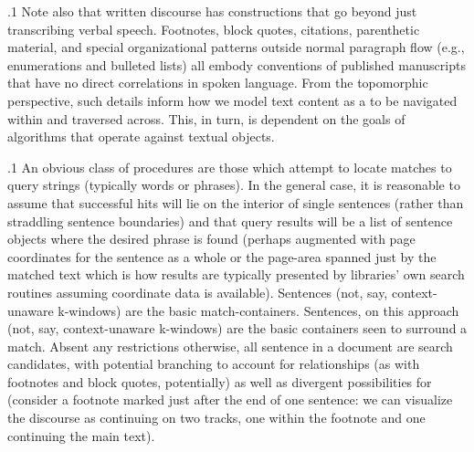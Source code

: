 \documentclass[11pt, twocolumn]{article}
\begin{document}
\p.1{%
Note also that written discourse has constructions that
go beyond just transcribing verbal speech. Footnotes,
block quotes, citations, parenthetic material, and
special organizational patterns outside normal
paragraph flow (e.g., enumerations and bulleted lists)
all embody conventions of published manuscripts
that have no direct correlations in spoken language.
From the topomorphic perspective, such details
inform how we model text content as a  to
be navigated within and traversed across. This,
in turn, is dependent on the goals of algorithms
that operate against textual objects.\enlargethispage{1em}
}%

\p.1{%
An obvious class of procedures are those which
attempt to locate matches to query strings (typically
words or phrases). In the general case, it is reasonable
to assume that successful hits will lie on the
interior of single sentences (rather than straddling
sentence boundaries) and that query results
will be a list of sentence objects where the desired
phrase is found (perhaps augmented with  page coordinates
for the sentence as a whole or the page-area spanned just
by the matched text \mdash{} which is how
results are typically presented by  libraries' own search routines
\mdash{} assuming  coordinate data is available). Sentences (not, say, context-unaware k-windows) are the
basic match-containers. Sentences, on this approach
(not, say, context-unaware k-windows) are the basic containers seen to surround a match. Absent
any restrictions otherwise, all sentence in a document are search candidates, with potential branching to account
for  relationships (as with footnotes and block quotes, potentially)
as well as divergent possibilities for  (consider a footnote
marked just after the end of one sentence: we can visualize the discourse
as continuing on two tracks, one within the footnote and one continuing the main text).\enlargethispage{1em}
}%
\end{document}
